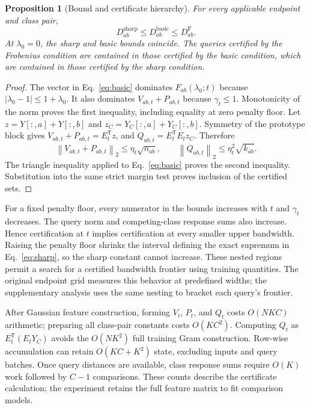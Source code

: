 \documentclass[preprint,12pt,authoryear]{elsarticle}
\newtheorem{proposition}{Proposition}
\newcommand{\norm}[1]{\left\lVert#1\right\rVert}
\newcommand{\tr}{\mathsf{T}}
\newcommand{\sharpb}{\mathrm{sharp}}
\newcommand{\basicb}{\mathrm{basic}}
\newcommand{\frobb}{\mathrm{F}}
\begin{document}
\begin{proposition}[Bound and certificate hierarchy]
For every applicable endpoint and class pair,
\begin{equation}
 D^{\sharpb}_{ab}\leq D^{\basicb}_{ab}\leq D^{\frobb}_{ab}.
 \label{eq:hierarchy}
\end{equation}
At $\lambda_0=0$, the sharp and basic bounds coincide. The queries certified by the Frobenius condition are contained in those certified by the basic condition, which are contained in those certified by the sharp condition.
\end{proposition}
\begin{proof}
The vector in Eq.~\eqref{eq:basic} dominates $F_{ab}(\lambda_0;t)$ because $|\lambda_0-1|\leq1+\lambda_0$. It also dominates $V_{ab,t}+P_{ab,t}$ because $\gamma_t\leq1$. Monotonicity of the norm proves the first inequality, including equality at zero penalty floor. Let $z=Y[:,a]+Y[:,b]$ and $z_C=Y_C[:,a]+Y_C[:,b]$. Symmetry of the prototype block gives $V_{ab,t}+P_{ab,t}=E_t^\tr z$, and $Q_{ab,t}=E_t^\tr E_tz_C$. Therefore
\[
 \norm{V_{ab,t}+P_{ab,t}}_2\leq\eta_t\sqrt{n_{ab}},
 \qquad
 \norm{Q_{ab,t}}_2\leq\eta_t^2\sqrt{k_{ab}}.
\]
The triangle inequality applied to Eq.~\eqref{eq:basic} proves the second inequality. Substitution into the same strict margin test proves inclusion of the certified sets.
\end{proof}

For a fixed penalty floor, every numerator in the bounds increases with $t$ and $\gamma_t$ decreases. The query norm and competing-class response sums also increase. Hence certification at $t$ implies certification at every smaller upper bandwidth. Raising the penalty floor shrinks the interval defining the exact supremum in Eq.~\eqref{eq:sharp}, so the sharp constant cannot increase. These nested regions permit a search for a certified bandwidth frontier using training quantities. The original endpoint grid measures this behavior at predefined widths; the supplementary analysis uses the same nesting to bracket each query's frontier.

After Gaussian feature construction, forming $V_t$, $P_t$, and $Q_t$ costs $O(NKC)$ arithmetic; preparing all class-pair constants costs $O(KC^2)$. Computing $Q_t$ as $E_t^\tr(E_tY_C)$ avoids the $O(NK^2)$ full training Gram construction. Row-wise accumulation can retain $O(KC+K^2)$ state, excluding inputs and query batches. Once query distances are available, class response sums require $O(K)$ work followed by $C-1$ comparisons. These counts describe the certificate calculation; the experiment retains the full feature matrix to fit comparison models.
\end{document}
